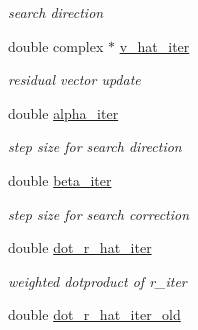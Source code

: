 \begin{CompactItemize}
\begin{CompactList}\small\item\em search direction \item\end{CompactList}\item 
\hypertarget{structimri__inh__2d1d__adjoint__plan_o9}{
double complex $\ast$ \hyperlink{structimri__inh__2d1d__adjoint__plan_o9}{v\_\-hat\_\-iter}}
\label{structimri__inh__2d1d__adjoint__plan_o9}

\begin{CompactList}\small\item\em residual vector update \item\end{CompactList}\item 
\hypertarget{structimri__inh__2d1d__adjoint__plan_o10}{
double \hyperlink{structimri__inh__2d1d__adjoint__plan_o10}{alpha\_\-iter}}
\label{structimri__inh__2d1d__adjoint__plan_o10}

\begin{CompactList}\small\item\em step size for search direction \item\end{CompactList}\item 
\hypertarget{structimri__inh__2d1d__adjoint__plan_o11}{
double \hyperlink{structimri__inh__2d1d__adjoint__plan_o11}{beta\_\-iter}}
\label{structimri__inh__2d1d__adjoint__plan_o11}

\begin{CompactList}\small\item\em step size for search correction \item\end{CompactList}\item 
\hypertarget{structimri__inh__2d1d__adjoint__plan_o12}{
double \hyperlink{structimri__inh__2d1d__adjoint__plan_o12}{dot\_\-r\_\-hat\_\-iter}}
\label{structimri__inh__2d1d__adjoint__plan_o12}

\begin{CompactList}\small\item\em weighted dotproduct of r\_\-iter \item\end{CompactList}\item 
\hypertarget{structimri__inh__2d1d__adjoint__plan_o13}{
double \hyperlink{structimri__inh__2d1d__adjoint__plan_o13}{dot\_\-r\_\-hat\_\-iter\_\-old}}
\label{structimri__inh__2d1d__adjoint__plan_o13}


\end{CompactItemize}
